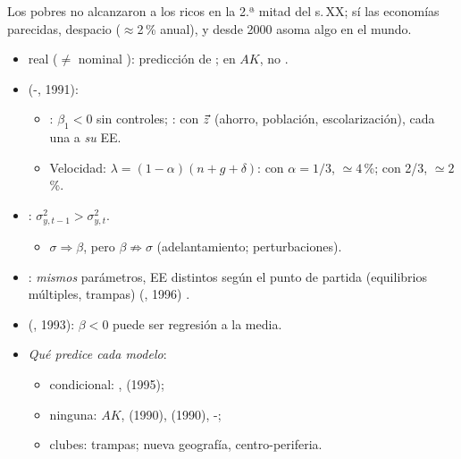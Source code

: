 \documentclass{article}
\begin{document}
\begin{columnas}
\begin{ideaclave}
Los pobres no alcanzaron a los ricos en la 2.ª mitad del s.\,XX; sí las economías parecidas, despacio ($\approx$2\,\% anual), y desde 2000 asoma algo en el mundo.
\end{ideaclave}

\begin{itemize}
\item {} real ($\neq$ nominal ): predicción de ; en $AK$, no .
\item {} (-, 1991):
  \begin{itemize}
  \item {}: $\beta_1<0$ sin controles; : con $\vec{z}$ (ahorro, población, escolarización), cada una a \emph{su} EE.
  \item Velocidad: $\lambda=(1-\alpha)(n+g+\delta)$: con $\alpha=1/3$, $\simeq4$\,\%; con 2/3, $\simeq2$\,\%.
  \end{itemize}
\item {}: $\sigma^2_{y,t-1}>\sigma^2_{y,t}$.
  \begin{itemize}
  \item $\sigma\Rightarrow\beta$, pero $\beta\not\Rightarrow\sigma$ (adelantamiento; perturbaciones).
  \end{itemize}
\end{itemize}
\begin{itemize}
\item {}: \emph{mismos} parámetros, EE distintos según el punto de partida (equilibrios múltiples, trampas) (, 1996) .
\item {} (, 1993): $\beta<0$ puede ser regresión a la media.
\item \emph{Qué predice cada modelo}:
  \begin{itemize}
  \item condicional: ,  (1995);
  \item ninguna: $AK$,  (1990),  (1990), -;
  \item clubes: trampas; nueva geografía, centro-periferia.
  \end{itemize}
\end{itemize}


\end{columnas}
\end{document}
